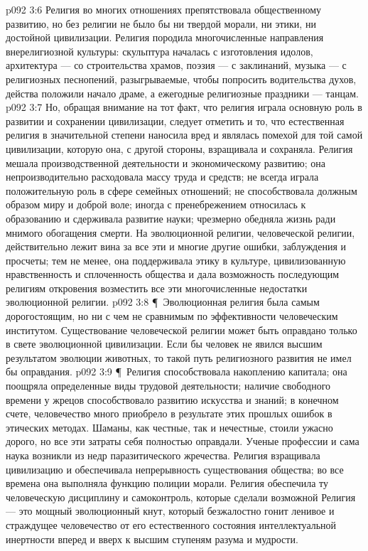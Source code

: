 \vs p092 3:6 Религия во многих отношениях препятствовала общественному развитию, но без религии не было бы ни твердой морали, ни этики, ни достойной цивилизации. Религия породила многочисленные направления внерелигиозной культуры: скульптура началась с изготовления идолов, архитектура --- со строительства храмов, поэзия --- с заклинаний, музыка --- с религиозных песнопений, разыгрываемые, чтобы попросить водительства духов, действа положили начало драме, а ежегодные религиозные праздники --- танцам.
\vs p092 3:7 Но, обращая внимание на тот факт, что религия играла основную роль в развитии и сохранении цивилизации, следует отметить и то, что естественная религия в значительной степени наносила вред и являлась помехой для той самой цивилизации, которую она, с другой стороны, взращивала и сохраняла. Религия мешала производственной деятельности и экономическому развитию; она непроизводительно расходовала массу труда и средств; не всегда играла положительную роль в сфере семейных отношений; не способствовала должным образом миру и доброй воле; иногда с пренебрежением относилась к образованию и сдерживала развитие науки; чрезмерно обедняла жизнь ради мнимого обогащения смерти. На эволюционной религии, человеческой религии, действительно лежит вина за все эти и многие другие ошибки, заблуждения и просчеты; тем не менее, она поддерживала этику в культуре, цивилизованную нравственность и сплоченность общества и дала возможность последующим религиям откровения возместить все эти многочисленные недостатки эволюционной религии.
\vs p092 3:8 \P\ Эволюционная религия была самым дорогостоящим, но ни с чем не сравнимым по эффективности человеческим институтом. Существование человеческой религии может быть оправдано только в свете эволюционной цивилизации. Если бы человек не явился высшим результатом эволюции животных, то такой путь религиозного развития не имел бы оправдания.
\vs p092 3:9 \P\ Религия способствовала накоплению капитала; она поощряла определенные виды трудовой деятельности; наличие свободного времени у жрецов способствовало развитию искусства и знаний; в конечном счете, человечество много приобрело в результате этих прошлых ошибок в этических методах. Шаманы, как честные, так и нечестные, стоили ужасно дорого, но все эти затраты себя полностью оправдали. Ученые профессии и сама наука возникли из недр паразитического жречества. Религия взращивала цивилизацию и обеспечивала непрерывность существования общества; во все времена она выполняла функцию полиции морали. Религия обеспечила ту человеческую дисциплину и самоконтроль, которые сделали возможной  Религия --- это мощный эволюционный кнут, который безжалостно гонит ленивое и страждущее человечество от его естественного состояния интеллектуальной инертности вперед и вверх к высшим ступеням разума и мудрости.
